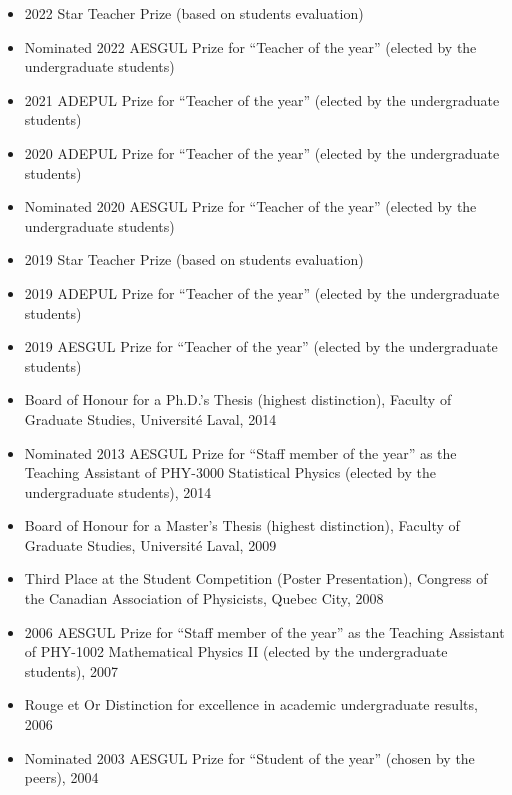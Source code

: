 \documentclass[11pt]{article}
\newcommand{\TitreSection}[1]{\colorbox{background}{\makebox[\textwidth-0.5em][c]{\Large\textrm{\textsc{#1}}}}\vspace{0.75\baselineskip}\\}
\begin{document}
\begin{itemize}
  \item 2022 Star Teacher Prize (based on students evaluation)
  \item Nominated 2022 AESGUL Prize for ``Teacher of the year'' (elected by the undergraduate students)
  \item 2021 ADEPUL Prize for ``Teacher of the year'' (elected by the undergraduate students)
  \item 2020 ADEPUL Prize for ``Teacher of the year'' (elected by the undergraduate students)
  \item Nominated 2020 AESGUL Prize for ``Teacher of the year'' (elected by the undergraduate students)
  \item 2019 Star Teacher Prize (based on students evaluation)
  \item 2019 ADEPUL Prize for ``Teacher of the year'' (elected by the undergraduate students)
  \item 2019 AESGUL Prize for ``Teacher of the year'' (elected by the undergraduate students)
  \item Board of Honour for a Ph.D.'s Thesis (highest distinction), Faculty of Graduate Studies, Universit\'e Laval, 2014
  \item Nominated 2013 AESGUL Prize for ``Staff member of the year'' as the Teaching Assistant of PHY-3000 Statistical Physics (elected by the undergraduate students), 2014
  \item Board of Honour for a Master's Thesis (highest distinction), Faculty of Graduate Studies, Universit\'e Laval, 2009
  \item Third Place at the Student Competition (Poster Presentation), Congress of the Canadian Association of Physicists, Quebec City, 2008
  \item 2006 AESGUL Prize for ``Staff member of the year'' as the Teaching Assistant of PHY-1002 Mathematical Physics II (elected by the undergraduate students), 2007
  \item Rouge et Or Distinction for excellence in academic undergraduate results, 2006
  \item Nominated 2003 AESGUL Prize for ``Student of the year'' (chosen by the peers), 2004
\end{itemize} \vspace{0.75\baselineskip}
%
%
%
%
%
\TitreSection{Teaching}
\end{document}
